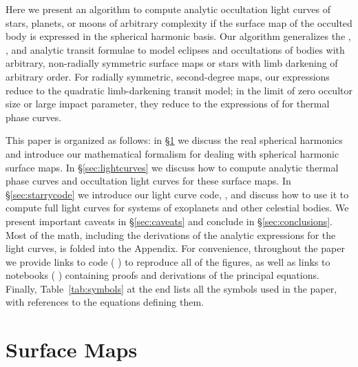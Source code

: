 \documentclass[modern]{aastex61}
\begin{document}
Here we present an algorithm to compute analytic occultation light curves of stars,
planets, or moons of arbitrary complexity if the surface map of the occulted body is expressed in the
spherical harmonic basis. Our algorithm generalizes the \citet{MandelAgol2002}, \citet{Gimenez2006},
and \citet{Pal2012} analytic transit formulae to model eclipses and occultations of bodies with arbitrary, non-radially
symmetric surface maps or stars with limb darkening of arbitrary order.
For radially symmetric, second-degree maps, our expressions reduce to the \citet{MandelAgol2002}
quadratic limb-darkening transit model; in the limit of zero occultor size or large
impact parameter, they
reduce to the expressions of \citet{Haggard2018} for thermal phase curves.


This paper is organized as follows: in \S\ref{sec:surfacemaps} we discuss the
real spherical harmonics and introduce our mathematical formalism for
dealing with spherical harmonic surface maps. In \S\ref{sec:lightcurves} we
discuss how to compute analytic thermal phase curves and occultation light curves
for these surface maps. In \S\ref{sec:starrycode} we introduce our
light curve code, \starry, and discuss how to use it to compute full
light curves for systems of exoplanets and other celestial bodies. We
present important caveats in \S\ref{sec:caveats} and conclude in \S\ref{sec:conclusions}.
Most of the math, including the derivations of the analytic expressions for the
light curves, is folded into the Appendix. For convenience, throughout
the paper we provide links
to \Python code (\,\codeicon\,) to reproduce all of the
figures, as well as links to \Jupyter notebooks
(\,\prooficon\,) containing proofs and derivations
of the principal
equations. Finally, Table~\ref{tab:symbols} at the end lists
all the symbols used
in the paper, with references to the equations defining them.

\section{Surface Maps}
\label{sec:surfacemaps}
\end{document}
